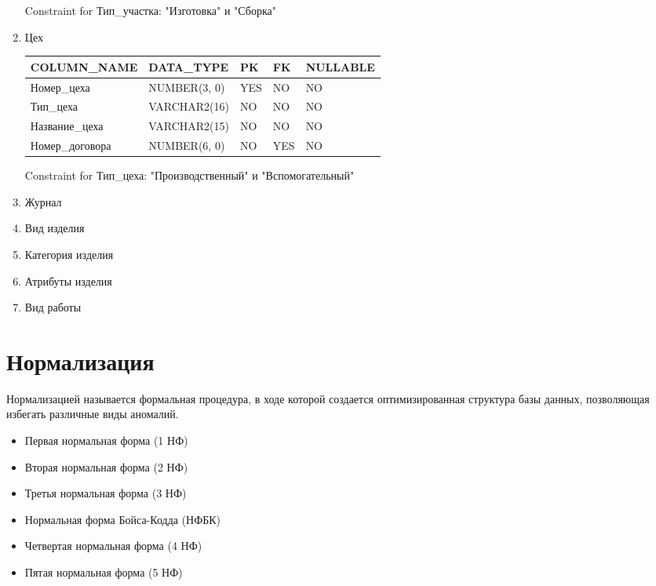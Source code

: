 \begin{enumerate}
\begin{tabular}{|p{4cm}|p{3cm}|p{1cm}|p{1cm}|p{2cm}|}
    \end{tabular}

    Constraint for Тип\_участка: "Изготовка" и "Сборка"

    \item{Цех}

    \begin{tabular}{|p{4cm}|p{3cm}|p{1cm}|p{1cm}|p{2cm}|} \hline

        {\bf COLUMN\_NAME} & {\bf DATA\_TYPE} & {\bf PK} & {\bf FK} & {\bf NULLABLE} \\ \hline
        Номер\_цеха & NUMBER(3, 0) & YES & NO & NO \\ \hline
        Тип\_цеха & VARCHAR2(16) & NO & NO & NO \\ \hline
        Название\_цеха & VARCHAR2(15) & NO & NO & NO \\ \hline
        Номер\_договора & NUMBER(6, 0) & NO & YES & NO \\ \hline

    \end{tabular}

    Constraint for Тип\_цеха: "Производственный" и "Вспомогательный"

    \item{Журнал}

    \item{Вид изделия}

    \item{Категория изделия}

    \item{Атрибуты изделия}

    \item{Вид работы}

\end{enumerate}

\section {Нормализация}
Нормализацией называется формальная процедура, в ходе которой создается оптимизированная структура базы данных, позволяющая избегать различные виды аномалий.

\begin{itemize}
    \item Первая нормальная форма (1 НФ)
    \item Вторая нормальная форма (2 НФ)
    \item Третья нормальная форма (3 НФ)
    \item Нормальная форма Бойса-Кодда (НФБК)
    \item Четвертая нормальная форма (4 НФ)
    \item Пятая нормальная форма (5 НФ)
\end{itemize}

